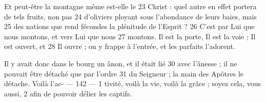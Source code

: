 Et peut-être la montagne même est-elle le	 
23	 	Christ : quel autre en effet portera de tels fruits, non pas	 
24	 	d'oliviers ployant sous l'abondance de leurs baies, mais	 
25	 	des nations que rend fécondes la plénitude de l'Esprit ?	 
26	 	C'est par Lui que nous montons, et vers Lui que nous	 
27	 	montons. Il est la porte, Il est la voie ; Il est ouvert, et	 
28	 	Il ouvre ; on y frappe à l'entrée, et les parfaits l'adorent.

Il y avait donc dans le bourg un ânon, et il était lié	 
30	 	avec l'ânesse ; il ne pouvait être détaché que par l'ordre	 
31	 	du Seigneur ; la main des Apôtres le détache. Voilà l'ac-	 
 	--- 142 ---	 
1	 	tivité, voilà la vie, voilà la grâce ; soyez cela, vous aussi,	 
2	 	afin de pouvoir délier les captifs.

